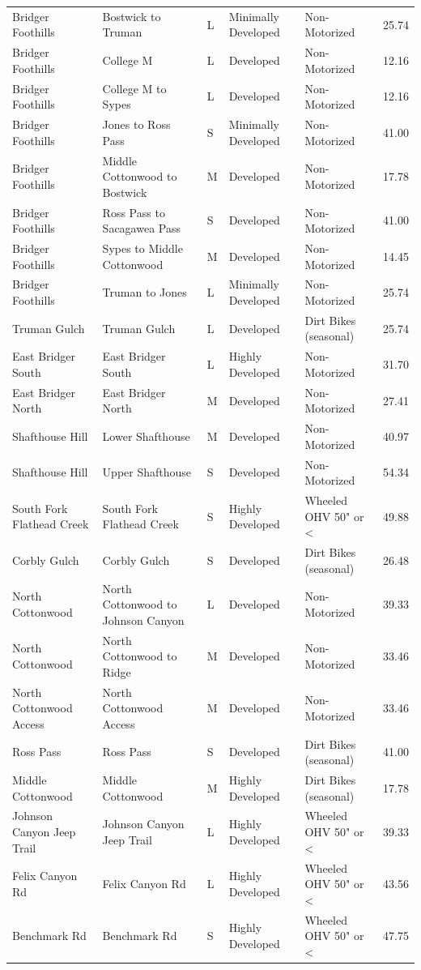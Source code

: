 \documentclass[
]{book}
\begin{document}
\begin{landscape}
\begin{table}
\begin{tabular}[t]{lllllr}
Bridger Foothills & Bostwick to Truman & L & Minimally Developed & Non-Motorized & 25.74\\
Bridger Foothills & College M & L & Developed & Non-Motorized & 12.16\\
Bridger Foothills & College M to Sypes & L & Developed & Non-Motorized & 12.16\\
\addlinespace
Bridger Foothills & Jones to Ross Pass & S & Minimally Developed & Non-Motorized & 41.00\\
Bridger Foothills & Middle Cottonwood to Bostwick & M & Developed & Non-Motorized & 17.78\\
Bridger Foothills & Ross Pass to Sacagawea Pass & S & Developed & Non-Motorized & 41.00\\
Bridger Foothills & Sypes to Middle Cottonwood & M & Developed & Non-Motorized & 14.45\\
Bridger Foothills & Truman to Jones & L & Minimally Developed & Non-Motorized & 25.74\\
\addlinespace
Truman Gulch & Truman Gulch & L & Developed & Dirt Bikes (seasonal) & 25.74\\
East Bridger South & East Bridger South & L & Highly Developed & Non-Motorized & 31.70\\
East Bridger North & East Bridger North & M & Developed & Non-Motorized & 27.41\\
Shafthouse Hill & Lower Shafthouse & M & Developed & Non-Motorized & 40.97\\
Shafthouse Hill & Upper Shafthouse & S & Developed & Non-Motorized & 54.34\\
\addlinespace
South Fork Flathead Creek & South Fork Flathead Creek & S & Highly Developed & Wheeled OHV 50" or < & 49.88\\
Corbly Gulch & Corbly Gulch & S & Developed & Dirt Bikes (seasonal) & 26.48\\
North Cottonwood & North Cottonwood to Johnson Canyon & L & Developed & Non-Motorized & 39.33\\
North Cottonwood & North Cottonwood to Ridge & M & Developed & Non-Motorized & 33.46\\
North Cottonwood Access & North Cottonwood Access & M & Developed & Non-Motorized & 33.46\\
\addlinespace
Ross Pass & Ross Pass & S & Developed & Dirt Bikes (seasonal) & 41.00\\
Middle Cottonwood & Middle Cottonwood & M & Highly Developed & Dirt Bikes (seasonal) & 17.78\\
Johnson Canyon Jeep Trail & Johnson Canyon Jeep Trail & L & Highly Developed & Wheeled OHV 50" or < & 39.33\\
Felix Canyon Rd & Felix Canyon Rd & L & Highly Developed & Wheeled OHV 50" or < & 43.56\\
Benchmark Rd & Benchmark Rd & S & Highly Developed & Wheeled OHV 50" or < & 47.75\\
\bottomrule
\end{tabular}
\end{table}
\end{landscape}
\end{document}
